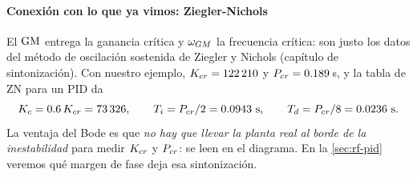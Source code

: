 \paragraph{Conexión con lo que ya vimos: Ziegler-Nichols}
El $\mathrm{GM}$ entrega la ganancia crítica y $\omega_{GM}$ la frecuencia crítica: son justo los datos del método de oscilación sostenida de Ziegler y Nichols (capítulo de sintonización). Con nuestro ejemplo, $K_{cr}=122\,210$ y $P_{cr}=0.189$\,s, y la tabla de ZN para un PID da
\[
  K_c=0.6\,K_{cr}=73\,326,\qquad T_i=P_{cr}/2=0.0943\ \text{s},\qquad T_d=P_{cr}/8=0.0236\ \text{s}.
\]
La ventaja del Bode es que \emph{no hay que llevar la planta real al borde de la inestabilidad} para medir $K_{cr}$ y $P_{cr}$: se leen en el diagrama. En la \cref{sec:rf-pid} veremos qué margen de fase deja esa sintonización.
